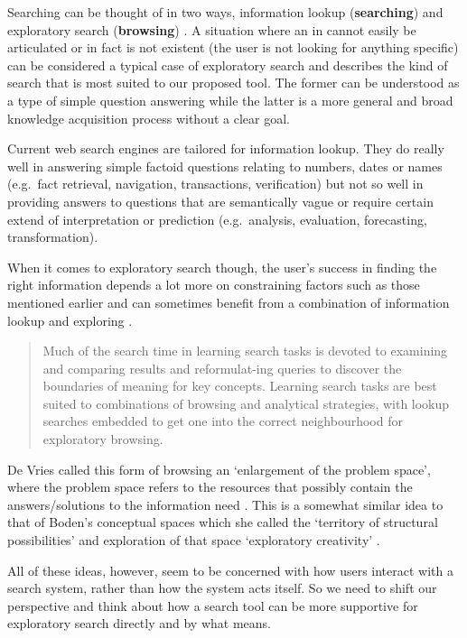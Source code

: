 Searching can be thought of in two ways, information lookup (\textbf{searching}) and exploratory search (\textbf{browsing}) \autocite{DeVries1993, Marchionini2006}. A situation where an \gls{in} cannot easily be articulated or in fact is not existent (the user is not looking for anything specific) can be considered a typical case of exploratory search and describes the kind of search that is most suited to our proposed tool. The former can be understood as a type of simple question answering while the latter is a more general and broad knowledge acquisition process without a clear goal.

Current web search engines are tailored for information lookup. They do really well in answering simple factoid questions relating to numbers, dates or names (e.g.\ fact retrieval, navigation, transactions, verification) but not so well in providing answers to questions that are semantically vague or require certain extend of interpretation or prediction (e.g.\ analysis, evaluation, forecasting, transformation).

When it comes to exploratory search though, the user’s success in finding the right information depends a lot more on constraining factors such as those mentioned earlier and can sometimes benefit from a combination of information lookup and exploring \autocite{Marchionini2006}.

\begin{quotation}
  Much of the search time in learning search tasks is devoted to examining and comparing results and reformulat-ing queries to discover the boundaries of meaning for key concepts. Learning search tasks are best suited to combinations of browsing and analytical strategies, with lookup searches embedded to get one into the correct neighbourhood for exploratory browsing. 
\end{quotation}

De Vries called this form of browsing an `enlargement of the problem space', where the problem space refers to the resources that possibly contain the answers/solutions to the information need \autocite{DeVries1993}. This is a somewhat similar idea to that of Boden’s conceptual spaces which she called the `territory of structural possibilities' and exploration of that space `exploratory creativity' \autocite{Boden2003}.

All of these ideas, however, seem to be concerned with how users interact with a search system, rather than how the system acts itself. So we need to shift our perspective and think about how a search tool can be more supportive for exploratory search directly and by what means.


